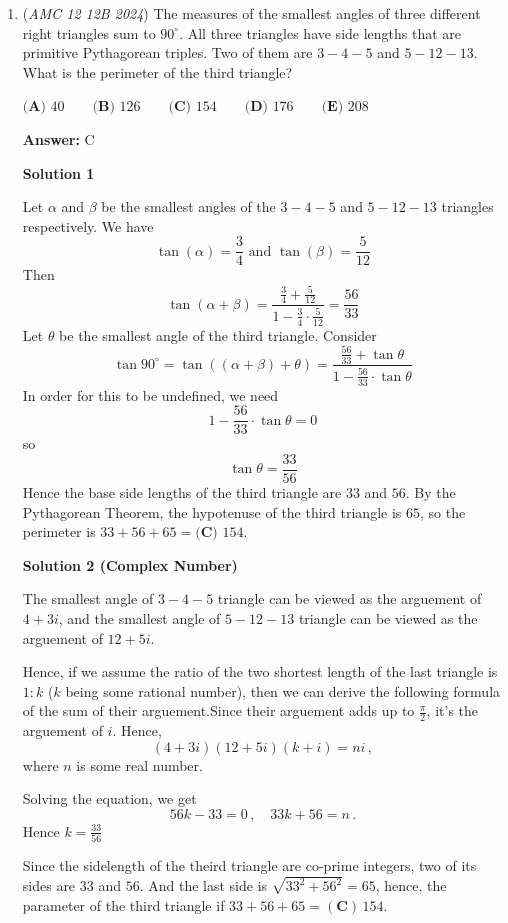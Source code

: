 \begin{enumerate}
 


	\item (\textit{AMC 12 12B 2024}) The measures of the smallest angles of three different right triangles sum to $90^\circ$. All three triangles have side lengths that are primitive Pythagorean triples. Two of them are $3-4-5$ and $5-12-13$. What is the perimeter of the third triangle?


 $\textbf{(A) }40 \qquad \textbf{(B) }126 \qquad \textbf{(C) }154 \qquad \textbf{(D) }176 \qquad \textbf{(E) }208 \qquad$

 \textbf{Answer: }C



\textbf{Solution 1}

Let $\alpha$ and $\beta$ be the smallest angles of the $3-4-5$ and $5-12-13$ triangles respectively. We have
 \[\tan(\alpha)=\frac{3}{4} \text{ and } \tan(\beta)=\frac{5}{12}\]Then
 \[\tan(\alpha+\beta)=\frac{\frac{3}{4}+\frac{5}{12}}{1-\frac{3}{4}\cdot\frac{5}{12}}=\frac{56}{33}\]Let $\theta$ be the smallest angle of the third triangle. Consider
 \[\tan{90^\circ}=\tan((\alpha+\beta)+\theta)=\frac{\frac{56}{33}+\tan{\theta}}{1-\frac{56}{33}\cdot\tan{\theta}}\]In order for this to be undefined, we need
 \[1-\frac{56}{33}\cdot\tan{\theta}=0\]so
 \[\tan{\theta}=\frac{33}{56}\]Hence the base side lengths of the third triangle are $33$ and $56$. By the Pythagorean Theorem, the hypotenuse of the third triangle is $65$, so the perimeter is $33+56+65=\boxed{\textbf{(C) }154}$.

 



\textbf{Solution 2 (Complex Number)}

The smallest angle of $3-4-5$ triangle can be viewed as the arguement of $4+3i$, and the smallest angle of $5-12-13$ triangle can be viewed as the arguement of $12+5i$.

 Hence, if we assume the ratio of the two shortest length of the last triangle is $1:k$ ($k$ being some rational number), then we can derive the following formula of the sum of their arguement.Since their arguement adds up to $\frac{\pi}{2}$, it's the arguement of $i$. Hence, 
 \[\left(4+3i\right)\left(12+5i\right)\left(k+i\right)=ni\,,\] where $n$ is some real number.

 Solving the equation, we get 
 \[56k-33=0\,,\quad 33k+56=n\,.\] Hence $k=\frac{33}{56}$

 Since the sidelength of the theird triangle are co-prime integers, two of its sides are $33$ and $56$. And the last side is $\sqrt{33^2+56^2}=65$, hence, the parameter of the third triangle if $33+56+65=\boxed{\mathbf{(C)}\,154}$.


\end{enumerate}
